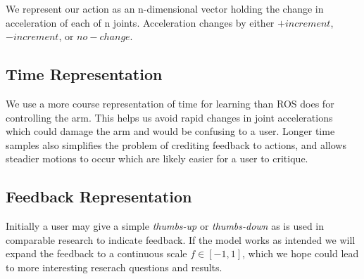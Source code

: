 \documentclass{article}
\begin{document}
We represent our action as an n-dimensional vector holding the change in acceleration of each of n joints. Acceleration changes by either $+increment$, $-increment$, or $no-change$. 

\subsection{Time Representation}

We use a more course representation of time for learning than ROS does for controlling the arm. This helps us avoid rapid changes in joint accelerations which could damage the arm and would be confusing to a user. Longer time samples also simplifies the problem of crediting feedback to actions, and allows steadier motions to occur which are likely easier for a user to critique. 

\subsection{Feedback Representation}

Initially a user may give a simple \textit{thumbs-up} or \textit{thumbs-down} as is used in comparable research to indicate feedback. If the model works as intended we will expand the feedback to a continuous scale $f \in [-1,1]$, which we hope could lead to more interesting reserach questions and results. 





\end{document}
